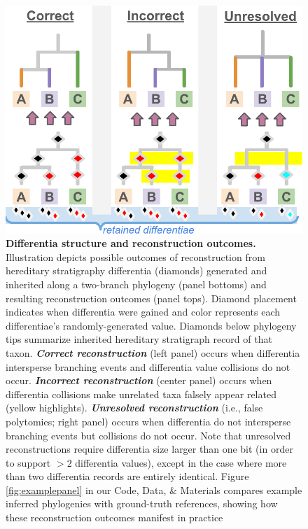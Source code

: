 \begin{figure}
  \centering
  \includegraphics[width=\linewidth]{img/hstrat-failure-modes}
  \caption{%
    \textbf{Differentia structure and reconstruction outcomes.}
    \footnotesize
    Illustration depicts possible outcomes of reconstruction from hereditary stratigraphy differentia (diamonds) generated and inherited along a two-branch phylogeny (panel bottoms) and resulting reconstruction outcomes (panel tops).
    Diamond placement indicates when differentia were gained and color represents each differentiae's randomly-generated value.
    Diamonds below phylogeny tips summarize inherited hereditary stratigraph record of that taxon.
    \textbf{\textit{Correct reconstruction}} (left panel) occurs when differentia intersperse branching events and differentia value collisions do not occur.
    \textbf{\textit{Incorrect reconstruction}} (center panel) occurs when differentia collisions make unrelated taxa falsely appear related (yellow highlights).
    \textbf{\textit{Unresolved reconstruction}} (i.e., false polytomies; right panel) occurs when differentia do not intersperse branching events but collisions do not occur.
    Note that unresolved reconstructions require differentia size larger than one bit (in order to support $>2$ differentia values), except in the case where more than two differentia records are entirely identical.
    Figure \ref{fig:examplepanel} in our Code, Data, \& Materials compares example inferred phylogenies with ground-truth references, showing how these reconstruction outcomes manifest in practice \citep{moreno2024supplemental}
  }
  \label{fig:hstrat-failure-modes}
\end{figure}
